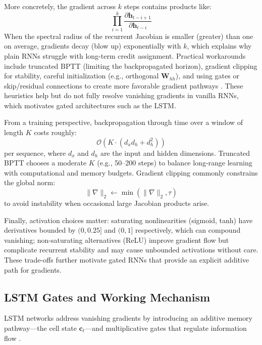More concretely, the gradient across \(k\) steps contains products like:
\begin{equation}
\prod_{i=1}^{k} \frac{\partial \mathbf{h}_{t-i+1}}{\partial \mathbf{h}_{t-i}}
\label{eq:gradient_product}
\end{equation}
When the spectral radius of the recurrent Jacobian is smaller (greater) than one on average, gradients decay (blow up) exponentially with \(k\), which explains why plain RNNs struggle with long-term credit assignment. Practical workarounds include truncated BPTT (limiting the backpropagated horizon), gradient clipping for stability, careful initialization (e.g., orthogonal \(\mathbf{W}_{hh}\)), and using gates or skip/residual connections to create more favorable gradient pathways \cite{pascanu2013difficulty}. These heuristics help but do not fully resolve vanishing gradients in vanilla RNNs, which motivates gated architectures such as the LSTM.

From a training perspective, backpropagation through time over a window of length \(K\) costs roughly:
\begin{equation}
\mathcal{O}(K \cdot (d_x d_h + d_h^2))
\label{eq:bptt_complexity}
\end{equation}
per sequence, where \(d_x\) and \(d_h\) are the input and hidden dimensions. Truncated BPTT chooses a moderate \(K\) (e.g., 50--200 steps) to balance long-range learning with computational and memory budgets. Gradient clipping commonly constrains the global norm:
\begin{equation}
\lVert \nabla \rVert_2 \leftarrow \min(\lVert \nabla \rVert_2, \tau)
\label{eq:gradient_clipping}
\end{equation}
to avoid instability when occasional large Jacobian products arise.

Finally, activation choices matter: saturating nonlinearities (sigmoid, tanh) have derivatives bounded by \((0, 0.25]\) and \((0, 1]\) respectively, which can compound vanishing; non-saturating alternatives (ReLU) improve gradient flow but complicate recurrent stability and may cause unbounded activations without care. These trade-offs further motivate gated RNNs that provide an explicit additive path for gradients.

\subsection{LSTM Gates and Working Mechanism}

LSTM networks address vanishing gradients by introducing an additive memory pathway---the cell state \(\mathbf{c}_t\)---and multiplicative gates that regulate information flow \cite{hochreiter1997long}. 

